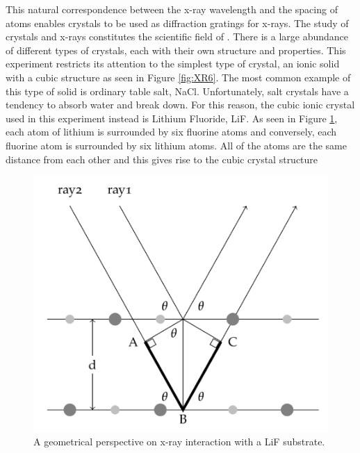 \documentclass[12pt, a4paper, oneside, openright, titlepage]{book}
\begin{document}
\noindent This natural correspondence between the x-ray wavelength and the spacing of atoms enables crystals to be used as diffraction gratings for x-rays. The study of crystals and x-rays constitutes the scientific field of . There is a large abundance of different types of crystals, each with their own structure and properties. This experiment restricts its attention to the simplest type of crystal, an ionic solid with a cubic structure as seen in Figure \ref{fig:XR6}. The most common example of this type of solid is ordinary table salt, NaCl. Unfortunately, salt crystals have a tendency to absorb water and break down. For this reason, the cubic ionic crystal used in this experiment instead is Lithium Fluoride, LiF. As seen in Figure \ref{fig:XR7}, each atom of lithium is surrounded by six fluorine atoms and conversely, each fluorine atom is surrounded by six lithium atoms. All of the atoms are the same distance from each other and this gives rise to the cubic crystal structure

\begin{figure}[H]
    \centering
    \includegraphics[scale = 0.8]{Images/XR7.PNG}
    \caption{A geometrical perspective on x-ray interaction with a LiF substrate.}
    \label{fig:XR7}
\end{figure}
\end{document}

